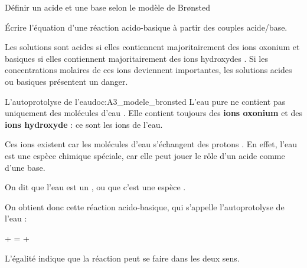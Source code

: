 \tetePremStssChim

\vspace*{-30pt}

\begin{objectifs}
  \item Définir un acide et une base selon le modèle de Br\o{}nsted
  \item Écrire l'équation d'une réaction acido-basique à partir des couples acide/base.
\end{objectifs}

\begin{contexte}
  Les solutions sont acides si elles contiennent majoritairement des ions oxonium \oxonium
  et basiques si elles contiennent majoritairement des ions hydroxydes \hydroxyde.
  Si les concentrations molaires de ces ions deviennent importantes, les solutions acides ou basiques présentent un danger.

\end{contexte}

\begin{doc}{L'autoprotolyse de l'eau}{doc:A3_modele_bronsted}
  L'eau pure ne contient pas uniquement des molécules d'eau .
  Elle contient toujours des \textbf{ions oxonium} \oxonium et des \textbf{ions hydroxyde} \hydroxyde : ce sont les ions de l'eau.

  Ces ions existent car les molécules d'eau  s'échangent des protons .
  En effet, l'eau est une espèce chimique spéciale, car elle peut jouer le rôle d'un acide comme d'une base.
  \begin{encart}  
    On dit que l'eau est un , ou que c'est une espèce .
  \end{encart}

  On obtient donc cette réaction acido-basique, qui s’appelle l’autoprotolyse de l’eau : 
  \begin{center}
     +  = \oxonium + \hydroxyde
  \end{center}
  \attention L'égalité indique que la réaction peut se faire dans les deux sens.
\end{doc}




